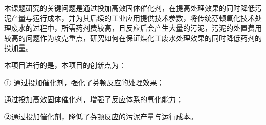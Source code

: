 本课题研究的关键问题是通过投加高效固体催化剂，在提高处理效果的同时降低污泥产量与运行成本，并为其后续的工业应用提供技术参数，将传统芬顿氧化技术处理废水的过程中，所需药剂费较高，且反应后会产生大量的污泥，污泥的处置费用较高的问题作为攻克重点，研究如何在保证煤化工废水处理效果的同时降低药剂的投加量。\par

本项目进行的是，本项目的创新点为：\par
① 通过投加催化剂，强化了芬顿反应的处理效果；\par
通过投加高效固体催化剂，增强了反应体系的氧化能力；\par
②通过投加催化剂，降低了芬顿反应的污泥产量与运行成本。\par

